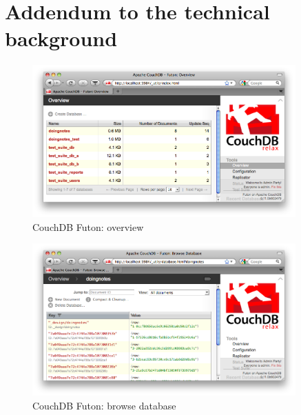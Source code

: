 \section{Addendum to the technical background}

\begin{figure}[H] 
  \begin{center}
    \includegraphics[width=0.9\textwidth]{grafik/futon-overview} 
  \end{center}
  \caption{CouchDB Futon: overview}
  \label{fig:futon-overview} 
\end{figure}

\begin{figure}[H] 
  \begin{center}
    \includegraphics[width=0.9\textwidth]{grafik/futon-browse-db} 
  \end{center}
  \caption{CouchDB Futon: browse database}
  \label{fig:futon-browse-db} 
\end{figure}

